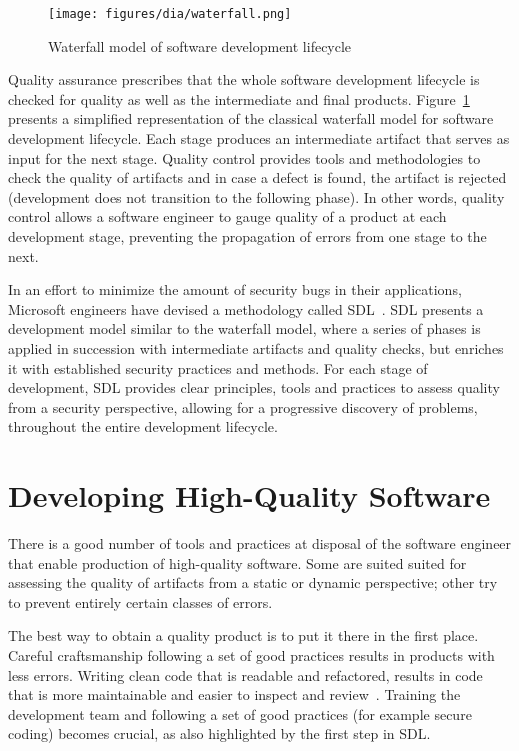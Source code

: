 \begin{figure}[h]
    \centering
    \texttt{[image: figures/dia/waterfall.png]}
    \caption{Waterfall model of software development lifecycle}
    \label{fig:waterfall}
\end{figure}

Quality assurance prescribes that the whole software development lifecycle is
checked for quality as well as the intermediate and final products.
Figure~\ref{fig:waterfall} presents a simplified representation of the classical
waterfall model for software development lifecycle. Each stage produces an
intermediate artifact that serves as input for the next stage. Quality control
provides tools and methodologies to check the quality of artifacts and in case a
defect is found, the artifact is rejected (development does not transition to
the following phase). In other words, quality control allows a software engineer
to gauge quality of a product at each development stage, preventing the
propagation of errors from one stage to the next.

In an effort to minimize the amount of security bugs in their applications,
Microsoft engineers have devised a methodology called
\ac{SDL}~\cite{lipner2004trustworthy}. \ac{SDL} presents a development model
similar to the waterfall model, where a series of phases is applied in
succession with intermediate artifacts and quality checks, but enriches it with
established security practices and methods. For each stage of development,
\ac{SDL} provides clear principles, tools and practices to assess quality from a
security perspective, allowing for a progressive discovery of problems,
throughout the entire development lifecycle.

\section{Developing High-Quality Software}
There is a good number of tools and practices at disposal of the software
engineer that enable production of high-quality software. Some are suited suited
for assessing the quality of artifacts from a static or dynamic perspective;
other try to prevent entirely certain classes of errors.

The best way to obtain a quality product is to put it there in the first place.
Careful craftsmanship following a set of good practices results in products with
less errors. Writing clean code that is readable and refactored, results in code
that is more maintainable and easier to inspect and
review~\cite{martin2009clean,fowler1999refactoring}. Training the development
team and following a set of good practices (for example secure coding) becomes
crucial, as also highlighted by the first step in \ac{SDL}.

